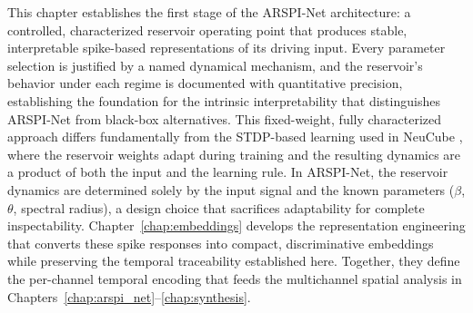 This chapter establishes the first stage of the ARSPI-Net architecture: a controlled, characterized reservoir operating point that produces stable, interpretable spike-based representations of its driving input. Every parameter selection is justified by a named dynamical mechanism, and the reservoir's behavior under each regime is documented with quantitative precision, establishing the foundation for the intrinsic interpretability that distinguishes ARSPI-Net from black-box alternatives. This fixed-weight, fully characterized approach differs fundamentally from the STDP-based learning used in NeuCube \cite{kasabov_neucube_2014}, where the reservoir weights adapt during training and the resulting dynamics are a product of both the input and the learning rule. In ARSPI-Net, the reservoir dynamics are determined solely by the input signal and the known parameters ($\beta$, $\theta$, spectral radius), a design choice that sacrifices adaptability for complete inspectability. Chapter~\ref{chap:embeddings} develops the representation engineering that converts these spike responses into compact, discriminative embeddings while preserving the temporal traceability established here. Together, they define the per-channel temporal encoding that feeds the multichannel spatial analysis in Chapters~\ref{chap:arspi_net}--\ref{chap:synthesis}.
